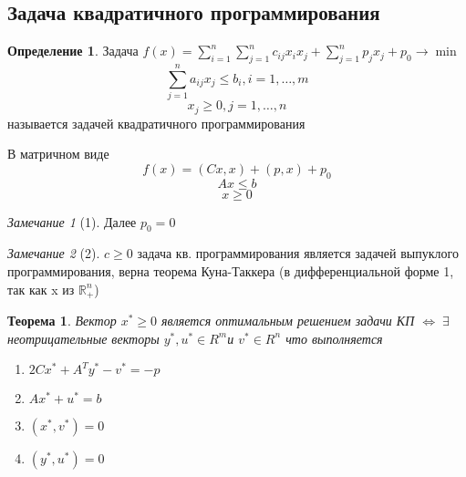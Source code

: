 \documentclass[a4paper]{article}
\newtheorem{theorem}{Теорема}[section]
\theoremstyle{definition}
\newtheorem*{definition}{Определение}
\theoremstyle{remark}
\newtheorem*{remark}{Замечание}
\begin{document}
\subsection{Задача квадратичного программирования}
\begin{definition}
    Задача $f(x) = \sum_{i=1}^{n}\sum_{j=1}^{n} c_{ij}x_i x_j +\sum_{j  = 1}^{n}p_j x_j +p_0\to \min$
    \[\sum_{j = 1}^n a_{ij}x_j \le b_i, i = 1, \dots, m\]
    \[x_j\ge 0, j = 1, \dots, n\]
    называется задачей квадратичного программирования
\end{definition}
В матричном виде
\[f(x) = (Cx, x) + (p, x) +p_0\]
\[Ax \le b\]
\[x \ge 0\]
\begin{remark}[1]
    Далее $p_0 = 0$
\end{remark}
\begin{remark}[2]
    $c\ge 0$ задача кв. программирования является задачей выпуклого программирования, верна теорема Куна-Таккера (в дифференциальной форме 1, так как x из $\mathbb{R}^n_+$)
\end{remark}
\begin{theorem}
    Вектор $x^*\ge 0$ является оптимальным решением задачи КП $\Leftrightarrow \; \exists$ неотрицательные векторы $y^*, u^*\in R^m$и $v^*\in R^n$ что выполняется 
    \begin{enumerate}
        \item $2Cx^* + A^T y^* - v^* = -p$
        \item $Ax^* + u^* = b$
        \item $(x^*, v^*) = 0$
        \item $(y^*, u^*) = 0$
    \end{enumerate}  
\end{theorem}
\end{document}
